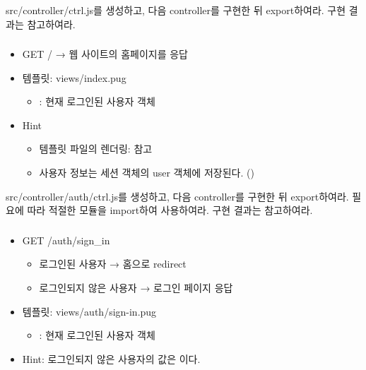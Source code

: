 src/controller/ctrl.js를 생성하고, 다음 controller를 구현한 뒤 export하여라. 구현 결과는 \를 참고하여라.

\subsubsection*{}
\begin{itemize}
    \item GET / → 웹 사이트의 홈페이지를 응답
    \item 템플릿: views/index.pug
    \begin{itemize}
        \item {}: 현재 로그인된 사용자 객체
    \end{itemize}
    \item Hint
    \begin{itemize}
        \item 템플릿 파일의 렌더링:  참고
        \item 사용자 정보는 세션 객체의 user 객체에 저장된다. ()
    \end{itemize}
\end{itemize}

src/controller/auth/ctrl.js를 생성하고, 다음 controller를 구현한 뒤 export하여라. 필요에 따라 적절한 모듈을 import하여 사용하여라. 구현 결과는 \를 참고하여라.

\subsubsection*{}
\begin{itemize}
    \item GET /auth/sign\_in
    \begin{itemize}
        \item 로그인된 사용자 → 홈으로 redirect
        \item 로그인되지 않은 사용자 → 로그인 페이지 응답
    \end{itemize}
    \item 템플릿: views/auth/sign-in.pug
    \begin{itemize}
        \item {}: 현재 로그인된 사용자 객체
    \end{itemize}
    \item Hint: 로그인되지 않은 사용자의  값은 이다.
\end{itemize}

